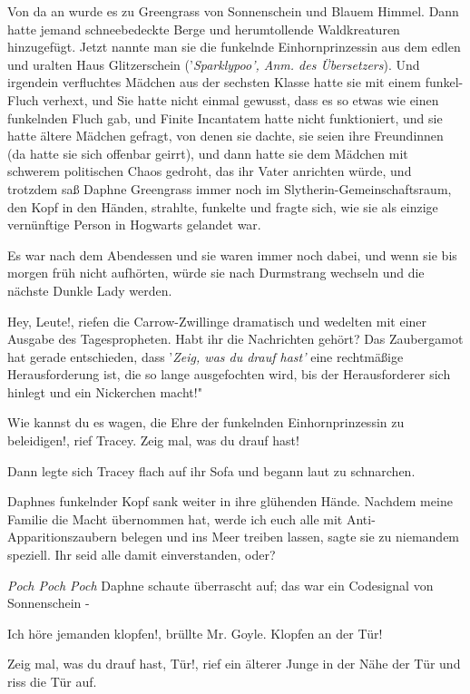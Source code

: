 Von da an wurde es zu Greengrass von Sonnenschein und Blauem Himmel. Dann hatte
jemand schneebedeckte Berge und herumtollende Waldkreaturen hinzugefügt. Jetzt
nannte man sie die funkelnde Einhornprinzessin aus dem edlen und uralten Haus
Glitzerschein ('\emph{Sparklypoo', Anm. des Übersetzers}). Und irgendein
verfluchtes Mädchen aus der sechsten Klasse hatte sie mit einem funkel-Fluch
verhext, und Sie hatte nicht einmal gewusst, dass es so etwas wie einen
funkelnden Fluch gab, und Finite Incantatem hatte nicht funktioniert, und sie
hatte ältere Mädchen gefragt, von denen sie dachte, sie seien ihre Freundinnen
(da hatte sie sich offenbar geirrt), und dann hatte sie dem Mädchen mit schwerem
politischen Chaos gedroht, das ihr Vater anrichten würde, und trotzdem saß
Daphne Greengrass immer noch im Slytherin-Gemeinschaftsraum, den Kopf in den
Händen, strahlte, funkelte und fragte sich, wie sie als einzige vernünftige
Person in Hogwarts gelandet war.

Es war nach dem Abendessen und sie waren immer noch dabei, und wenn sie bis
morgen früh nicht aufhörten, würde sie nach Durmstrang wechseln und die nächste
Dunkle Lady werden.

\glqq{}Hey, Leute!\grqq{}, riefen die Carrow-Zwillinge dramatisch und wedelten
mit einer Ausgabe des Tagespropheten. \glqq{}Habt ihr die Nachrichten gehört? Das
Zaubergamot hat gerade entschieden, dass '\emph{Zeig, was du drauf hast'} eine
rechtmäßige Herausforderung ist, die so lange ausgefochten wird, bis der
Herausforderer sich hinlegt und ein Nickerchen macht!"

\glqq{}Wie kannst du es wagen, die Ehre der funkelnden Einhornprinzessin zu
beleidigen!\grqq{}, rief Tracey. \glqq{}Zeig mal, was du drauf hast!\grqq{}

Dann legte sich Tracey flach auf ihr Sofa und begann laut zu schnarchen.

Daphnes funkelnder Kopf sank weiter in ihre glühenden Hände. \glqq{}Nachdem meine
Familie die Macht übernommen hat, werde ich euch alle mit
Anti-Apparitionszaubern belegen und ins Meer treiben lassen\grqq{}, sagte sie zu
niemandem speziell. \glqq{}Ihr seid alle damit einverstanden, oder?\grqq{}

\emph{Poch Poch Poch}
Daphne schaute überrascht auf; das war ein Codesignal von Sonnenschein -

\glqq{}Ich höre jemanden klopfen!\grqq{}, brüllte Mr. Goyle. \glqq{}Klopfen an der
Tür!\grqq{}

\glqq{}Zeig mal, was du drauf hast, Tür!\grqq{}, rief ein älterer Junge in der
Nähe der Tür und riss die Tür auf.

